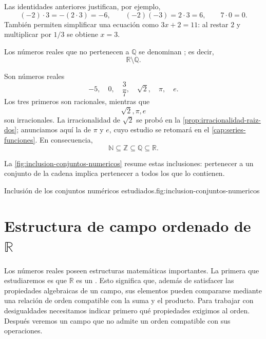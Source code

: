 \begin{example}
Las identidades anteriores justifican, por ejemplo,
\[
(-2)\cdot3=-(2\cdot3)=-6,
\qquad
(-2)(-3)=2\cdot3=6,
\qquad
7\cdot0=0.
\]
También permiten simplificar una ecuación como $3x+2=11$: al restar $2$ y multiplicar por $1/3$ se obtiene $x=3$.
\end{example}

Los números reales que no pertenecen a $\mathbb{Q}$ se denominan ; es decir,
\[
\mathbb{R}\setminus\mathbb{Q}.
\]

\begin{example}
Son números reales
\[
-5,\quad 0,\quad \frac37,\quad \sqrt2,\quad \pi,\quad e.
\]
Los tres primeros son racionales, mientras que
\[
\sqrt2,\pi,e
\]
son irracionales. La irracionalidad de $\sqrt2$ se probó en la \cref{prop:irracionalidad-raiz-dos}; anunciamos aquí la de $\pi$ y $e$, cuyo estudio se retomará en el \cref{cap:series-funciones}. En consecuencia,
\[
\mathbb{N}\subseteq\mathbb{Z}\subseteq\mathbb{Q}\subseteq\mathbb{R}.
\]
\end{example}

La \cref{fig:inclusion-conjuntos-numericos} resume estas inclusiones: pertenecer a un conjunto de la cadena implica pertenecer a todos los que lo contienen.

\begin{figuranotas}{Inclusión de los conjuntos numéricos estudiados.}{fig:inclusion-conjuntos-numericos}

\end{figuranotas}

\section{Estructura de campo ordenado de \texorpdfstring{$\mathbb{R}$}{R}}
\label{sec:campo-ordenado}

Los números reales poseen estructuras matemáticas importantes. La primera que estudiaremos es que $\mathbb{R}$ es un . Esto significa que, además de satisfacer las propiedades algebraicas de un campo, sus elementos pueden compararse mediante una relación de orden compatible con la suma y el producto. Para trabajar con desigualdades necesitamos indicar primero qué propiedades exigimos al orden. Después veremos un campo que no admite un orden compatible con sus operaciones.

